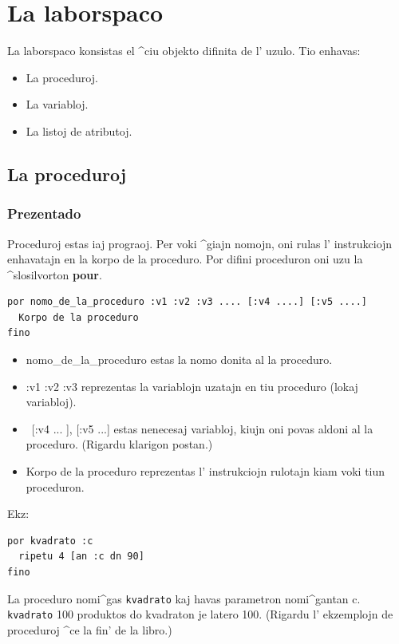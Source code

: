 \section{La laborspaco}

La laborspaco konsistas el ^ciu objekto difinita de l' uzulo.  Tio
enhavas:
\begin{itemize}
 \item La proceduroj.
 \item La variabloj.
 \item La listoj de atributoj.
\end{itemize}

\subsection{La proceduroj}

\subsubsection{Prezentado}

Proceduroj estas iaj \og prograoj\fg.  Per voki ^giajn nomojn, oni
rulas l' instrukciojn enhavatajn en la korpo de la proceduro.  Por
difini proceduron oni uzu la ^slosilvorton \textbf{pour}.
 

\begin{verbatim}
por nomo_de_la_proceduro :v1 :v2 :v3 .... [:v4 ....] [:v5 ....]
  Korpo de la proceduro
fino
\end{verbatim}

\begin{itemize}
\item nomo\_de\_la\_proceduro estas la nomo donita al la proceduro.
\item :v1 :v2 :v3 reprezentas la variablojn uzatajn en tiu proceduro
  (lokaj variabloj).
\item \ [:v4 ... ], [:v5 ...] estas nenecesaj variabloj, kiujn oni
  povas aldoni al la proceduro.  (Rigardu klarigon postan.)
\item Korpo de la proceduro reprezentas l' instrukciojn rulotajn kiam
  voki tiun proceduron.
\end{itemize}

Ekz: 
\begin{verbatim}
por kvadrato :c
  ripetu 4 [an :c dn 90]
fino
\end{verbatim}

La proceduro nomi^gas \texttt{kvadrato} kaj havas parametron
nomi^gantan c. \texttt{kvadrato} 100 produktos do kvadraton je latero
100.  (Rigardu l' ekzemplojn de proceduroj ^ce la fin' de la libro.)

